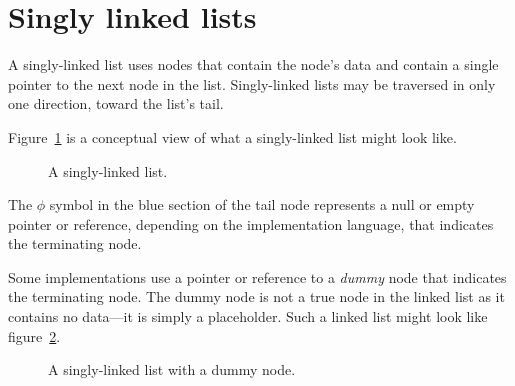 \documentclass{article}
\begin{document}
  \section{Singly linked lists}
  A singly-linked list uses nodes that contain the node's data and contain a single pointer to the next node in the list. Singly-linked lists may be traversed in only one direction, toward the list's tail.

  Figure~\ref{fig:singlelinkedlist} is a conceptual view of what a singly-linked list might look like.
  \begin{figure}[h]
    \centering
    \caption{A singly-linked list.}
    \label{fig:singlelinkedlist}
  \end{figure}

  The $\phi$ symbol in the blue section of the tail node represents a null or empty pointer or reference, depending on the implementation language, that indicates the terminating node.

  Some implementations use a pointer or reference to a \emph{dummy} node that indicates the terminating node. The dummy node is not a true node in the linked list as it contains no data---it is simply a placeholder. Such a linked list might look like figure~\ref{fig:singlelinkedlist-dummy}.
  \begin{figure}[h]
    \centering
    \caption{A singly-linked list with a dummy node.}
    \label{fig:singlelinkedlist-dummy}
  \end{figure}
\end{document}
